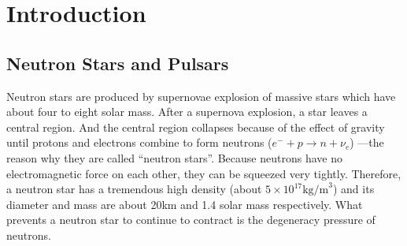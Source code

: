 \documentclass[a4paper, 12pt]{report}
\begin{document}
			

\tableofcontents


\cleardoublepage
{}
{}
\listoffigures

\cleardoublepage
{}
{}
\listoftables



 
\cleardoublepage
\newpage
\listoftables


\chapter{Introduction}   	   
  \section{Neutron Stars and Pulsars}
    Neutron stars are produced by supernovae explosion of massive stars which have about four 
    to eight solar mass. After a supernova explosion, a star leaves a central region. 
    And the central region collapses because of the effect of 
    gravity until protons and electrons combine to form neutrons 
    ($e^{-}+p\rightarrow n+\nu_{e}$) ---the reason why they are called ``neutron stars''.  
    Because neutrons have no electromagnetic force on each other, they can be squeezed very 
    tightly. Therefore, a neutron star has a tremendous high density 
    (about $5\times 10^{17} \mbox{kg/m}^3$) and its diameter and mass are about 20km and 
    1.4 solar mass respectively. What
    prevents a neutron star to continue to contract is the degeneracy pressure of neutrons. 
    
\end{document}
